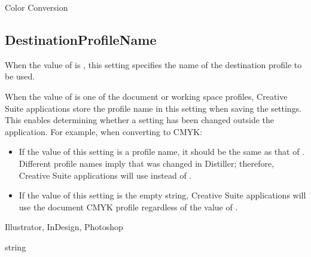 \documentclass[letterpaper,12pt,english,openany,oneside]{sphinxmanual}
\begin{document}
Color Conversion

\label{\detokenize{PDF_Create_NewNamespaces:default-value-6}}

\begin{sphinxVerbatim}[commandchars=\\\{\}]
\end{sphinxVerbatim}




\subsection{DestinationProfileName}
\label{\detokenize{PDF_Create_NewNamespaces:destinationprofilename}}
When the value of  is  , this setting specifies the name of the destination profile to be used.

When the value of  is one of the document or working space profiles, Creative Suite applications store the profile name in this setting when saving the settings. This enables determining whether a setting has been changed outside the application. For example, when converting to CMYK:
\begin{itemize}
\item {} 
If the value of this setting is a profile name, it should be the same as that of  . Different profile names imply that  was changed in Distiller; therefore, Creative Suite applications will use  instead of  .

\item {} 
If the value of this setting is the empty string, Creative Suite applications will use the document CMYK profile regardless of the value of  .

\end{itemize}
\label{\detokenize{PDF_Create_NewNamespaces:supported-by-7}}

Illustrator, InDesign, Photoshop

\label{\detokenize{PDF_Create_NewNamespaces:type-7}}

string
\end{document}
